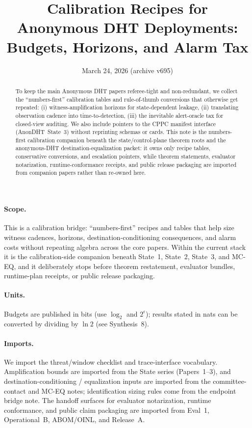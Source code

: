 \documentclass[11pt]{article}
\title{Calibration Recipes for Anonymous DHT Deployments:\\ Budgets, Horizons, and Alarm Tax}
\author{}
\date{March 24, 2026 (archive v695)}
\begin{document}
\maketitle

\begin{abstract}
To keep the main Anonymous DHT papers referee-tight and non-redundant, we collect the ``numbers-first'' calibration tables and rule-of-thumb conversions that otherwise get repeated:
(i) witness-amplification horizons for state-dependent leakage,
(ii) translating observation cadence into time-to-detection,
(iii) the inevitable alert-oracle tax for closed-view auditing.
We also include pointers to the CPPC manifest interface (AnonDHT~State~3) without reprinting schemas or cards.\cite{state3}
This note is the numbers-first calibration companion beneath the state/control-plane theorem roots and the anonymous-DHT destination-equalization packet: it owns only recipe tables, conservative conversions, and escalation pointers, while theorem statements, evaluator notarization, runtime-conformance receipts, and public release packaging are imported from companion papers rather than re-owned here.\cite{state1,state2,state3,series:mceq,series:eval1,series:opB,series:abom,series:releaseproperty}
\end{abstract}
\paragraph{Scope.}
This is a calibration bridge: ``numbers-first'' recipes and tables that help size witness cadences, horizons, destination-conditioning consequences, and alarm costs without repeating algebra across the core papers. Within the current stack it is the calibration-side companion beneath State~1, State~2, State~3, and MC-EQ, and it deliberately stops before theorem restatement, evaluator bundles, runtime-plan receipts, or public release packaging.\cite{state1,state2,state3,series:mceq,series:eval1,series:opB,series:abom,series:releaseproperty}

\paragraph{Units.} Budgets are published in bits (use $\log_2$ and $2^{\epsilon}$); results stated in nats can be converted by dividing by $\ln 2$ (see Synthesis~8).\cite{series:notation}

\paragraph{Imports.}
We import the threat/window checklist and trace-interface vocabulary.\cite{series:threatwindows,series:traceifaces}
Amplification bounds are imported from the State series (Papers~1--3), and destination-conditioning / equalization inputs are imported from the committee-contact and MC-EQ notes; identification sizing rules come from the endpoint bridge note.\cite{state1,state2,state3,series:mceq,synth5}
The handoff surfaces for evaluator notarization, runtime conformance, and public claim packaging are imported from Eval~1, Operational~B, ABOM/OINL, and Release~A.\cite{series:eval1,series:opB,series:abom,series:releaseproperty}
\end{document}
